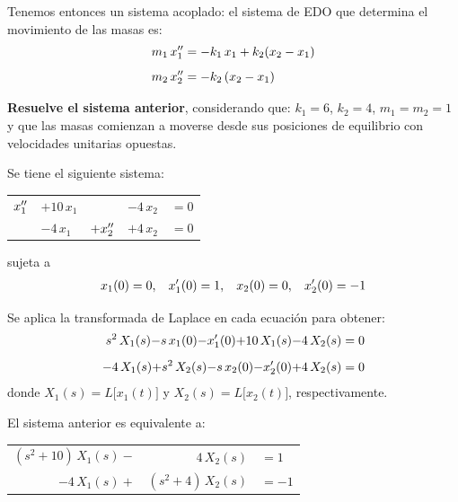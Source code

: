 Tenemos entonces un sistema acoplado: el sistema de EDO que determina el movimiento de las masas es:
\begin{align*}
m_{1} \, {x}^{\prime \prime}_{1} &= - k_{1} \, x_{1} + k_{2} (x_{2} - x_{1}) \\[0.5em]
m_{2} \, {x}^{\prime \prime}_{2} &= - k_{2} \, (x_{2} - x_{1})
\end{align*}

\textbf{Resuelve el sistema anterior}, considerando que: $k_{1} = 6$, $k_{2} = 4$, $m_{1} = m_{2} = 1$ y que las masas comienzan a moverse desde sus posiciones de equilibrio con velocidades unitarias opuestas.

Se tiene el siguiente sistema:
\begin{table}[H]
\centering
\large
\begin{tabular}{l l l l l }
${x}^{\prime \prime}_{1}$ & $+ 10 \, x_{1}$ &  & $- 4 \, x_{2}$ & $= 0$ \\[0.5em]
 & $-4 \, x_{1}$ & $+{x}^{\prime \prime}_{2}$ & $+ 4 \, x_{2}$ & $=0$
\end{tabular}
\end{table}
sujeta a 
\begin{align*}
x_{1}(0) = 0, \hspace{0.3cm} {x}^{\prime}_{1}(0) = 1, \hspace{0.3cm} x_{2}(0) = 0, \hspace{0.3cm} {x}^{\prime}_{2}(0) = -1
\end{align*}

Se aplica la transformada de Laplace en cada ecuación para obtener: 
\begin{align*}
s^{2} \, X_{1}(s) {-} s \, x_{1}(0) {-} {x}^{\prime}_{1}(0) {+} 10 \, X_{1}(s) {-} 4 \, X_{2}(s) = 0 \\[0.5em]
- 4 \, X_{1}(s) {+} s^{2} \, X_{2}(s) {-} s \, x_{2}(0) {-} {x}^{\prime}_{2}(0) {+} 4 \, X_{2}(s) = 0
\end{align*}
donde $X_{1}(s) = L \big[x_{1} (t)\big]$ y $X_{2}(s) = L \big[x_{2} (t)\big]$, respectivamente.

El sistema anterior es equivalente a:
\begin{table}[H]
\centering
\large
\begin{tabular}{r r l }
$(s^{2} + 10) \, X_{1}(s)-$ & $4 \, X_{2}(s)$ & $=1$ \\[0.5em]
$-4 \, X_{1}(s)+$ &$(s^{2} + 4) \, X_{2}(s)$ & $=-1$
\end{tabular}
\end{table}


